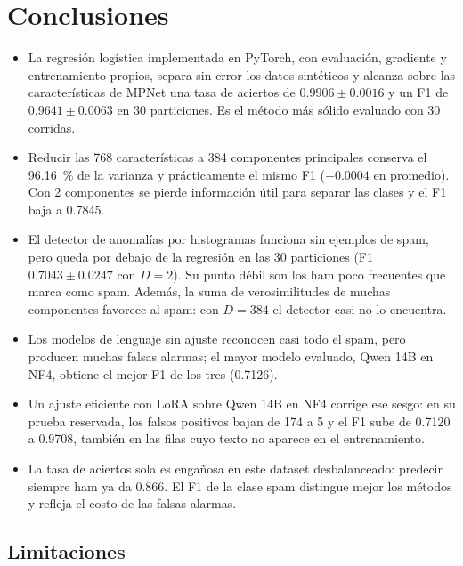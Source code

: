 \section{Conclusiones}
\label{sec:conclusiones}

\begin{itemize}
    \item La regresión logística implementada en PyTorch, con evaluación,
    gradiente y entrenamiento propios, separa sin error los datos
    sintéticos y alcanza sobre las características de MPNet una tasa de
    aciertos de $0.9906\pm0.0016$ y un F1 de $0.9641\pm0.0063$ en 30
    particiones. Es el método más sólido evaluado con 30 corridas.
    \item Reducir las 768 características a 384 componentes principales
    conserva el 96.16~\% de la varianza y prácticamente el mismo F1
    ($-0.0004$ en promedio). Con 2 componentes se pierde información útil
    para separar las clases y el F1 baja a 0.7845.
    \item El detector de anomalías por histogramas funciona sin ejemplos de
    spam, pero queda por debajo de la regresión en las 30 particiones (F1
    $0.7043\pm0.0247$ con $D=2$). Su punto débil son los ham poco
    frecuentes que marca como spam. Además, la suma de verosimilitudes de
    muchas componentes favorece al spam: con $D=384$ el detector casi no lo
    encuentra.
    \item Los modelos de lenguaje sin ajuste reconocen casi todo el spam,
    pero producen muchas falsas alarmas; el mayor modelo evaluado, Qwen 14B
    en NF4, obtiene el mejor F1 de los tres (0.7126).
    \item Un ajuste eficiente con LoRA sobre Qwen 14B en NF4 corrige ese
    sesgo: en su prueba reservada, los falsos positivos bajan de 174 a 5 y
    el F1 sube de 0.7120 a 0.9708, también en las filas cuyo texto no
    aparece en el entrenamiento.
    \item La tasa de aciertos sola es engañosa en este dataset desbalanceado:
    predecir siempre ham ya da 0.866. El F1 de la clase spam distingue
    mejor los métodos y refleja el costo de las falsas alarmas.
\end{itemize}

\subsection{Limitaciones}
\label{sec:limitaciones}

